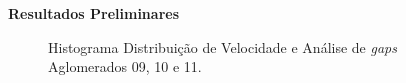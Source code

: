 \documentclass[xcolor=dvipsnames,10pt]{beamer}
\begin{document}
\begin{frame}{\textbf{Resultados Preliminares}}
\begin{figure}[!htbp]
    \caption{Histograma Distribuição de Velocidade e Análise de \textit{gaps} Aglomerados 09, 10 e 11.}
  \end{figure}
\end{frame}
\end{document}

